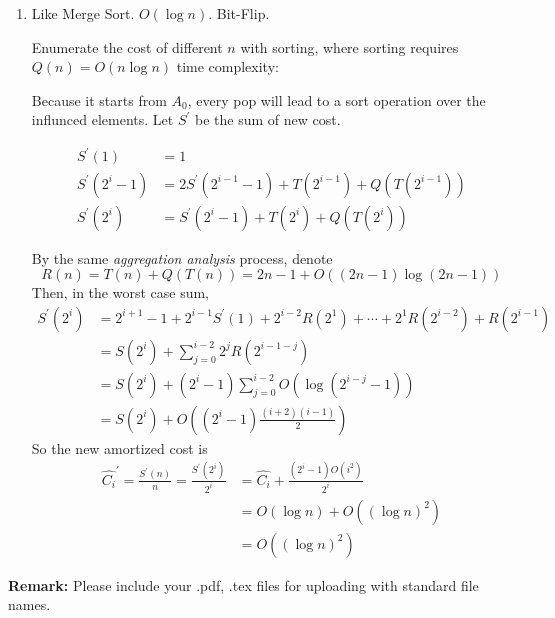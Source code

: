 \documentclass[12pt,a4paper]{article}
\makeatletter
\newtheorem*{solution}{Solution}
\theoremstyle{definition}
\renewenvironment{solution}[1][Solution] {\par\pushQED{\qed}\normalfont\topsep6\p@\@plus6\p@\relax\trivlist\item[\hskip\labelsep\bfseries#1\@addpunct{.}]\ignorespaces}{\popQED\endtrivlist\@endpefalse} \makeatother
\makeatother
\begin{document}
\begin{enumerate}
\begin{enumerate}
\begin{solution}
			Like Merge Sort. $O(\log n)$. Bit-Flip.

			\begin{tcolorbox}[skin=mycross]
			Enumerate the cost of different $n$ with sorting, where sorting requires $Q(n)=O(n\log n)$ time complexity:

			

			Because it starts from $A_0$, every pop will lead to a sort operation over the influnced elements. Let $S^\prime$ be the sum of new cost.

			\begin{align*}
				S^\prime(1) &= 1\\
				S^\prime(2^i-1) &= 2S^\prime(2^{i-1}-1) + T(2^{i-1}) + Q(T(2^{i-1}))\\
				S^\prime(2^i) &= S^\prime(2^{i}-1) + T(2^i)+ Q(T(2^i))
			\end{align*}

			By the same \emph{aggregation analysis} process, denote 
			\begin{equation*}
				R(n)=T(n)+Q(T(n))=2n-1+O((2n-1)\log(2n-1))
			\end{equation*}
			Then, in the worst case sum,
			\begin{align*}
				S^\prime(2^i) &= 
				2^{i+1} - 1 + 2^{i-1}S^\prime(1) + 2^{i-2}R(2^1) + \cdots + 2^1R(2^{i-2}) +R(2^{i-1})\\
				&= S(2^i) + \sum_{j=0}^{i-2} 2^j R(2^{i-1-j})\\
				&= S(2^i) + (2^i-1)\sum_{j=0}^{i-2} O(\log(2^{i-j}-1))\\
				&= S(2^i) + O\left((2^i-1)\frac{(i+2)(i-1)}{2}\right)
			\end{align*}
			So the new amortized cost is
			\begin{align*}
				\hat{C_i}^\prime = \frac{S^\prime(n)}{n}= \frac{S^\prime(2^i)}{2^i} &= \hat{C_i} +\frac{(2^i-1)O(i^2)}{2^i} \\&= O(\log n) + O((\log n)^2)\\&=O((\log n)^2)
			\end{align*}

		\end{tcolorbox}
		\end{solution}
    \end{enumerate}
	
\end{enumerate}



\textbf{Remark:} Please include your .pdf, .tex files for uploading with standard file names.


\end{document}
